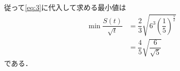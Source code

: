 \documentclass[../../main.tex]{subfiles}
\begin{document}
従って\cref{eq:3}に代入して求める最小値は
\begin{align}
  \min \dfrac{S(t)}{\sqrt{t}}
  &= \dfrac{2}{3} \sqrt{ 6^3 \left(\dfrac{1}{5}\right)^{\frac{5}{2}} } \\
  &= \dfrac{4}{5} \sqrt{\dfrac{6}{\sqrt{5}}}
\end{align}
である．
\end{document}
